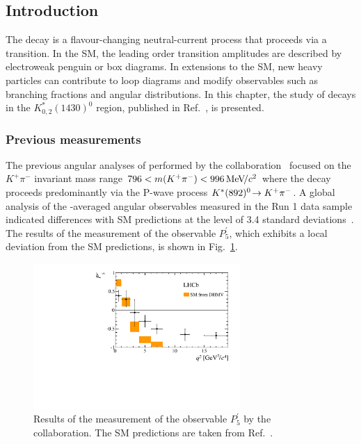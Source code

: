 \subsection{Introduction}
\label{sec:kpimm:introduction}

The decay \BdToKpimm is a flavour-changing neutral-current process that proceeds via a \btosmm transition. In the SM, the leading order transition amplitudes are described by electroweak penguin or box diagrams.  In extensions to the SM, new heavy particles can contribute to loop diagrams and modify observables such as branching fractions and angular distributions. In this chapter, the study of \BdToKpimm decays in the $K^{*}_{0,2}(1430)^{0}$ region, published in Ref.~\cite{LHCb-PAPER-2016-025-TMP}, is presented.

\subsubsection[Previous \btosmm measurements]{Previous \boldmath{\btosmm} measurements}
The previous angular analyses of \BdToKpimm performed by the \lhcb collaboration~\cite{LHCB-PAPER-2011-020,LHCB-PAPER-2013-019,LHCB-PAPER-2013-037,LHCB-PAPER-2015-051} focused on the $K^{+}\pi^{-}$ invariant mass range $796<m({{K}^+}{{\pi}^-})<996{\mathrm{\,Me\kern -0.1em V\!/}c^2}$ where the decay proceeds predominantly via the P-wave process ${{K}^*}(892)^{0}\!\rightarrow {\ensuremath{{K}^+}}{\ensuremath{{\pi}^-}}$. A global analysis of the \CP-averaged angular observables measured in the \lhcb Run 1 data sample indicated differences with SM predictions at the level of 3.4 standard deviations~\cite{LHCB-PAPER-2015-051}. The results of the measurement of the observable $P_{5}^{'}$, which exhibits a local deviation from the SM predictions, is shown in Fig.~\ref{fig:kpimm:p5prime}.

\begin{figure}[!b]
\centering
\includegraphics[width=0.7\textwidth]{figs/kpimm/introduction/P5prime.pdf}
\caption{Results of the measurement of the observable $P_{5}^{'}$ by the \lhcb collaboration. The SM predictions are taken from Ref.~\cite{pprime-theory}.}
\label{fig:kpimm:p5prime}
\end{figure}

